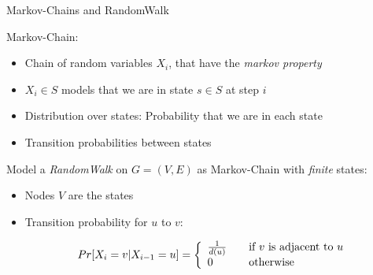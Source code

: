 \begin{frame}{Markov-Chains and RandomWalk}

Markov-Chain:

\begin{itemize}
\itemsep1pt\parskip0pt
\item
  Chain of random variables $X_i$, that have the \emph{markov property}
\item
  $X_i \in S$ models that we are in state $s \in S$ at step $i$
\item
  Distribution over states: Probability that we are in each state
\item
  Transition probabilities between states
\end{itemize}

Model a \emph{RandomWalk} on $G = (V, E)$ as Markov-Chain with
\emph{finite} states:

\begin{itemize}
\item
  Nodes $V$ are the states
\item
  Transition probability for $u$ to $v$:

  \[ Pr[X_i = v | X_{i-1} = u] = \left\{
    \begin{array}{l l}
      \frac{1}{d(u)} & \quad \text{if $v$ is adjacent to $u$}\\
      0 & \quad \text{otherwise}
    \end{array} \right.
  \]
\end{itemize}

\end{frame}

